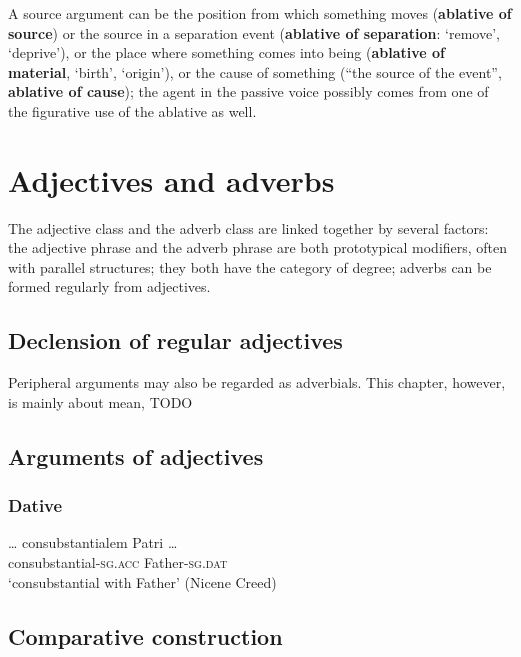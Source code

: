 \documentclass[a4paper, oneside, 12pt]{report}
\newcommand*{\concept}[1]{\textbf{#1}}
\newcommand*{\category}[1]{\textsc{#1}}
\newcommand{\translate}[1]{`#1'}
\begin{document}
A source argument
can be the position from which something moves 
(\concept{ablative of source})
or the source in a separation event 
(\concept{ablative of separation}: \translate{remove}, \translate{deprive}),
or the place where something comes into being 
(\concept{ablative of material}, \translate{birth}, \translate{origin}), 
or the cause of something (``the source of the event'', \concept{ablative of cause});
the agent in the passive voice possibly 
comes from one of the figurative use of the ablative as well.

\chapter{Adjectives and adverbs}

The adjective class and the adverb class are linked together by several factors:
the adjective phrase and the adverb phrase are both prototypical modifiers,
often with parallel structures;
they both have the category of degree; 
adverbs can be formed regularly from adjectives.

\section{Declension of regular adjectives}

Peripheral arguments may also be regarded as adverbials.
This chapter, however, is mainly about mean, TODO

\section{Arguments of adjectives}

\subsection{Dative}

\begin{exe}
    \ex \gll \dots {} consubstantialem Patri \dots \\
    {} consubstantial-\category{sg.acc} Father-\category{sg.dat} \\
    \glt \translate{consubstantial with Father} (Nicene Creed)
\end{exe}

\section{Comparative construction}
\end{document}

